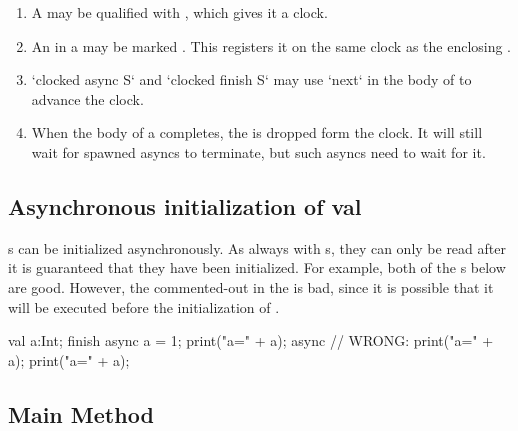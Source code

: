 \begin{enumerate}
\item A  may be qualified with , which gives it a
      clock.
\item An  in a  may be marked .
      This registers it on the same clock as the enclosing .  
\item \xcd`clocked async S` and \xcd`clocked finish S` may use \xcd`next` in
      the body of  to advance the clock.
\item When the body of a  completes, the  is dropped form the clock.  It will still wait for spawned
      asyncs to terminate, but such asyncs need to wait for it.
\end{enumerate}



\subsection{Asynchronous initialization of val}

s can be initialized asynchronously.   As always with s,
they can only be read after it is guaranteed that they have been initialized.
For example, both of the s below are good.  However, the
commented-out  in the  is bad, since it is possible that
it will be executed before the initialization of . 
\begin{xten}
val a:Int;
finish {
  async {
     a = 1; 
     print("a=" + a);
  }
  async {
     // WRONG: print("a=" + a);
  }
}
print("a=" + a);
\end{xten}



\subsection{Main Method}


